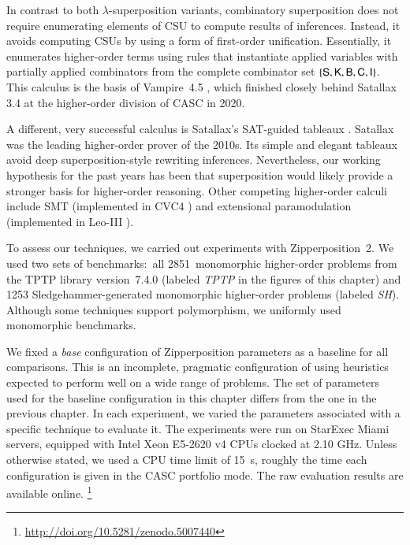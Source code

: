 In contrast to both $\lambda$-superposition variants, combinatory superposition
does not require enumerating elements of CSU to compute results of inferences.
Instead, it avoids computing CSUs by using a form of first-order unification.
Essentially, it enumerates higher-order terms using rules that instantiate
applied variables with partially applied combinators from the complete
combinator set $\{\mathsf{S}, \mathsf{K}, \mathsf{B}, \mathsf{C}, \mathsf{I}\}$. This calculus
is the basis of Vampire~4.5 \cite{br-20-full-sup-w-combs}, which finished
closely behind Satallax 3.4 %
at the higher-order division of CASC in 2020.

A different, very successful calculus is Satallax's SAT-guided tableaux
\cite{backes-brown-2011}. Satallax was the leading higher-order prover of the
2010s. Its simple and elegant tableaux avoid deep superposition-style rewriting
inferences.
Nevertheless, our working hypothesis for the past years has been
that superposition would likely provide a stronger basis for higher-order
reasoning.
Other competing higher-order calculi include SMT (implemented in CVC4
\cite{brotb-19-ho-smt, cbetal-11-cvc4}) and extensional paramodulation (implemented in Leo-III \cite{sb-21-leo3}).

To assess our techniques, we carried out experiments with Zipperposition~2. We
used two sets of benchmarks:\ all 2851~monomorphic higher-order problems from the
TPTP library \cite{gs-17-tptp} version~7.4.0 (labeled \emph{TPTP} in the figures of this chapter)
and 1253 Sledgehammer-generated
monomorphic higher-order problems (labeled \emph{SH}).
Although some techniques support polymorphism, we
uniformly used monomorphic benchmarks.

We fixed a \emph{base} configuration
of Zipperposition parameters as a baseline for all comparisons. This is an
incomplete, pragmatic configuration of \osup{} using heuristics expected to perform
well on a wide range of problems. The set of parameters used for the baseline configuration in this
chapter differs from the one in the previous chapter.
In each experiment, we varied
the parameters associated with a specific technique to evaluate it. The
experiments were run on StarExec Miami \cite{sst-14-starexec} servers, equipped with
Intel Xeon E5-2620 v4 CPUs clocked at 2.10 GHz. Unless otherwise stated, we used a
CPU time limit of 15~s, roughly the time each configuration is given in the
CASC portfolio mode. The raw evaluation results are available online.%
\footnote{\url{http://doi.org/10.5281/zenodo.5007440}}

